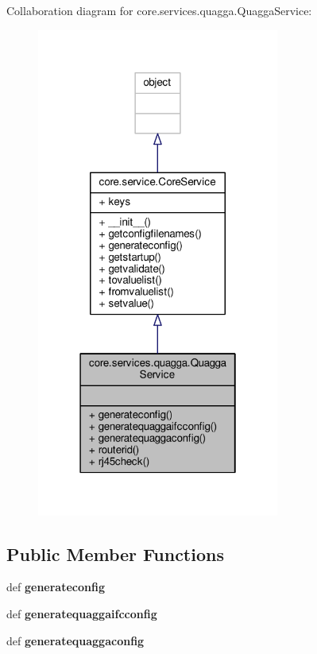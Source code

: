 Collaboration diagram for core.\+services.\+quagga.\+Quagga\+Service\+:
\nopagebreak
\begin{figure}[H]
\begin{center}
\leavevmode
\includegraphics[width=226pt]{classcore_1_1services_1_1quagga_1_1_quagga_service__coll__graph}
\end{center}
\end{figure}
\subsection*{Public Member Functions}
\begin{DoxyCompactItemize}
\item 
\hypertarget{classcore_1_1services_1_1quagga_1_1_quagga_service_a2879a25737d65ce3f584218b5bbaef9d}{def {\bfseries generateconfig}}\label{classcore_1_1services_1_1quagga_1_1_quagga_service_a2879a25737d65ce3f584218b5bbaef9d}

\item 
\hypertarget{classcore_1_1services_1_1quagga_1_1_quagga_service_ae7efdbe72afc1b4e70d05756dd6ea03b}{def {\bfseries generatequaggaifcconfig}}\label{classcore_1_1services_1_1quagga_1_1_quagga_service_ae7efdbe72afc1b4e70d05756dd6ea03b}

\item 
\hypertarget{classcore_1_1services_1_1quagga_1_1_quagga_service_af416bf1723311ec61cf5f9c16ec713fe}{def {\bfseries generatequaggaconfig}}\label{classcore_1_1services_1_1quagga_1_1_quagga_service_af416bf1723311ec61cf5f9c16ec713fe}

\end{DoxyCompactItemize}
